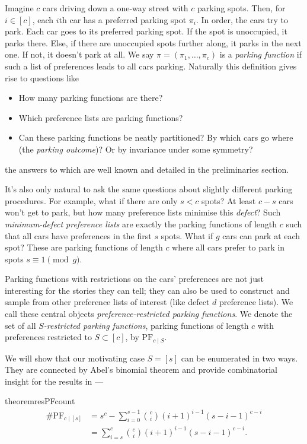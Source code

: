 \documentclass[12 pt]{amsart}
\theoremstyle{definition} %
\theoremstyle{remark} %
\begin{document}
Imagine $c$ cars driving down a one-way street with $c$ parking spots. Then, for $i \in [c]$, each $i$th car has a preferred parking spot $\pi_{i}$. In order, the cars try to park. Each car goes to its preferred parking spot. If the spot is unoccupied, it parks there. Else, if there are unoccupied spots further along, it parks in the next one. If not, it doesn't park at all. We say $\pi = (\pi_{1}, \dots, \pi_{c})$ is a \emph{parking function} if such a list of preferences leads to all cars parking. Naturally this definition gives rise to questions like
\begin{itemize}
	\item How many parking functions are there?
	\item Which preference lists are parking functions?
	\item Can these parking functions be neatly partitioned? By which cars go where (the \emph{parking outcome})? Or by invariance under some symmetry?
\end{itemize}
the answers to which are well known and detailed in the preliminaries section.

It's also only natural to ask the same questions about slightly different parking procedures. For example, what if there are only $s < c$ spots? At least $c - s$ cars won't get to park, but how many preference lists minimise this \emph{defect}? Such \emph{minimum-defect preference lists} are exactly the parking functions of length $c$ such that all cars have preferences in the first $s$ spots. What if $g$ cars can park at each spot? These are parking functions of length $c$ where all cars prefer to park in spots $s \equiv 1 \pmod g$.

Parking functions with restrictions on the cars' preferences are not just interesting for the stories they can tell; they can also be used to construct and sample from other preference lists of interest (like defect $d$ preference lists). We call these central objects \emph{preference-restricted parking functions}. We denote the set of all \emph{$S$-restricted parking functions}, parking functions of length $c$ with preferences restricted to  $S \subset [c]$, by $\mathrm{PF}_{c \mid S}$.

We will show that our motivating case $S = [s]$ can be enumerated in two ways. They are connected by Abel's binomial theorem and provide combinatorial insight for the results in \cite{cameron-johannsen-prellberg-schweitzer-2008} ---

\begin{restatable}{theorem}{resPFcount}
	\label{thm:resPFcount}
	\[
		\begin{split}
			\# \mathrm{PF}_{c \mid [s]} & = s^{c} - \sum_{i = 0}^{s - 1} \binom{c}{i} (i + 1)^{i - 1} (s - i - 1)^{c - i} \\
				    & = \sum_{i = s}^{c} \binom{c}{i} (i + 1)^{i - 1} (s - i - 1)^{c - i}.
		\end{split}
	\]
\end{restatable}
\end{document}
